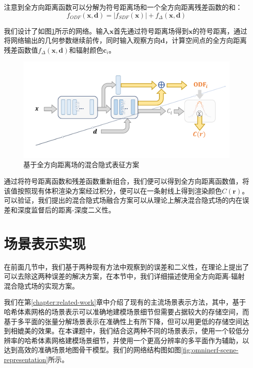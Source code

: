 注意到全方向距离函数可以分解为符号距离场和一个全方向距离残差函数的和：
\begin{equation}
    f_{ODF}(\mathbf{x}, \mathbf{d}) = |f_{SDF}(\mathbf{x})| + f_\Delta(\mathbf{x}, \mathbf{d})
    \label{eq: omninerf-odf decomposition}
\end{equation}

我们设计了如图\ref{fig:omninerf-model}所示的网络。输入$\mathbf{x}$首先通过符号距离场得到$\mathbf{x}$的符号距离，通过将网络输出的几何参数继续前传，同时输入观察方向$\mathbf{d}$，计算空间点的全方向距离残差函数值$f_\Delta(\mathbf{x},\mathbf{d})$和辐射颜色$\mathbf{c}_i$。

\begin{figure}[ht]
    \centering
    \includegraphics[width=\textwidth]{undergraduate-thesis/images/omninerf-model.pdf}
    \caption{基于全方向距离场的混合隐式表征方案}
    \label{fig:omninerf-model}
\end{figure}

通过将符号距离函数和残差函数重新组合，我们便可以得到全方向距离函数值，将该值按照现有体积渲染方案经过积分，便可以在一条射线上得到渲染颜色$C(\mathbf{r})$。 可以验证，我们提出的混合隐式场融合方案可以从理论上解决混合隐式场的内在误差和深度监督后的距离-深度二义性。

\section{场景表示实现}
在前面几节中，我们基于两种现有方法中观察到的误差和二义性，在理论上提出了可以去除这两种误差的解决方案，在本节中，我们详细描述使用全方向距离-辐射混合隐式场的实现方案。

我们在第\ref{chapter:related-work}章中介绍了现有的主流场景表示方法，其中，基于哈希体素网格的场景表示可以准确地建模场景细节但需要占据较大的存储空间，而基于多平面的张量分解场景表示在准确性上有所下降，但可以用更低的存储空间达到相媲美的效果。在本课题中，我们结合这两种不同的场景表示，使用一个较低分辨率的哈希体素网格建模场景细节，并使用一个更高分辨率的多平面作为辅助，以达到高效的准确场景地图骨干模型。我们的网络结构图如图\ref{fig:omninerf-scene-representation}所示。

